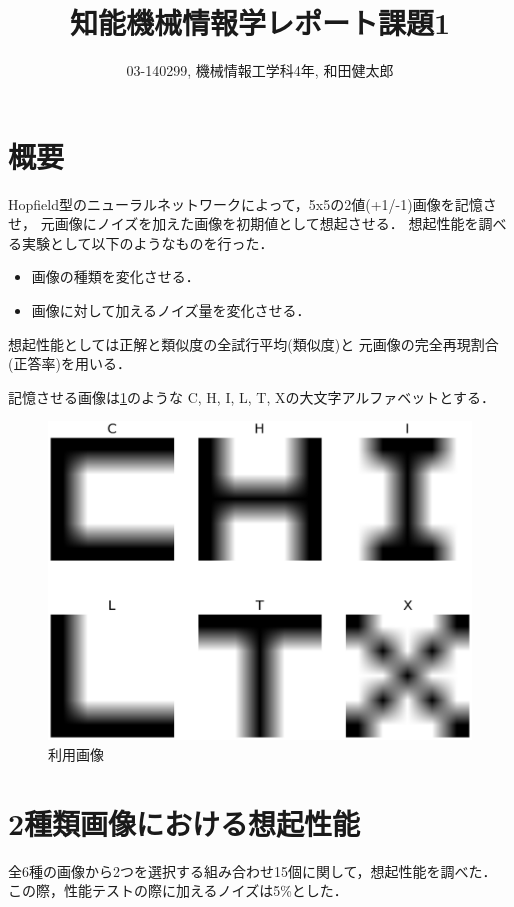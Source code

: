 \documentclass[10pt,twocolumn]{jarticle}
\title{知能機械情報学レポート課題1}
\author{03-140299, 機械情報工学科4年, 和田健太郎}
\newcommand{\figref}[1]{\figurename\ref{fig:#1}}
\begin{document}
\maketitle


\section{概要}
Hopfield型のニューラルネットワークによって，5x5の2値(+1/-1)画像を記憶させ，
元画像にノイズを加えた画像を初期値として想起させる．
想起性能を調べる実験として以下のようなものを行った．
\begin{itemize}
  \item 画像の種類を変化させる．
  \item 画像に対して加えるノイズ量を変化させる．
\end{itemize}

想起性能としては正解と類似度の全試行平均(類似度)と
元画像の完全再現割合(正答率)を用いる．

記憶させる画像は\figref{original-images}のような
C, H, I, L, T, Xの大文字アルファベットとする．
\begin{figure}[htbp]
  \centering
    \includegraphics[width=\columnwidth]{figs/alphabet_images}
    \caption{利用画像}
  \label{fig:original-images}
\end{figure}


\section{2種類画像における想起性能}\label{sec:two-label-performance}
全6種の画像から2つを選択する組み合わせ15個に関して，想起性能を調べた．
この際，性能テストの際に加えるノイズは5\%とした．
\end{document}
